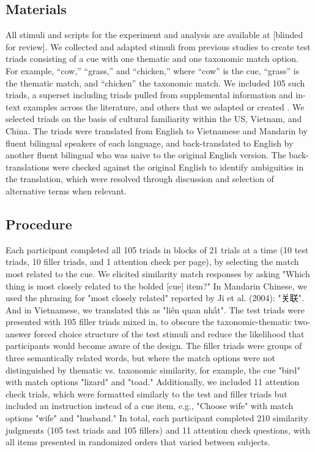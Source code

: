 \documentclass[10pt, letterpaper]{article}
\begin{document}
\hypertarget{materials}{%
\subsection{Materials}\label{materials}}

All stimuli and scripts for the experiment and analysis are available at
{[}blinded for review{]}. We collected and adapted stimuli from previous
studies to create test triads consisting of a cue with one thematic and
one taxonomic match option. For example, ``cow,'' ``grass,'' and
``chicken,'' where ``cow'' is the cue, ``grass'' is the thematic match,
and ``chicken'' the taxonomic match. We included 105 such triads, a
superset including triads pulled from supplemental information and
in-text examples across the literature, and others that we adapted or
created . We selected triads on the basis of cultural familiarity within
the US, Vietnam, and China. The triads were translated from English to
Vietnamese and Mandarin by fluent bilingual speakers of each language,
and back-translated to English by another fluent bilingual who was naive
to the original English version. The back-translations were checked
against the original English to identify ambiguities in the translation,
which were resolved through discussion and selection of alternative
terms when relevant.

\hypertarget{procedure}{%
\subsection{Procedure}\label{procedure}}

\begin{CJK*}{UTF8}{gbsn}
Each participant completed all 105 triads in blocks of 21 trials at a time (10 test triads, 10 filler triads, and 1 attention check per page), by selecting the match most related to the cue. We elicited similarity match responses by asking "Which thing is most closely related to the bolded [cue] item?" In Mandarin Chinese, we used the phrasing for "most closely related" reported by Ji et al. (2004): "关联". And in Vietnamese, we translated this as "liên quan nhất".
The test triads were presented with 105 filler triads mixed in, to obscure the taxonomic-thematic two-answer forced choice structure of the test stimuli and reduce the likelihood that participants would become aware of the design.
The filler triads were groups of three semantically related words, but where the match options were not distinguished by thematic vs. taxonomic similarity, for example, the cue "bird" with match options "lizard" and "toad." Additionally, we included 11 attention check trials, which were formatted similarly to the test and filler triads but included an instruction instead of a cue item, e.g., "Choose wife" with match options "wife" and "husband." In total, each participant completed 210 similarity judgments (105 test triads and 105 fillers) and 11 attention check questions, with all items presented in randomized orders that varied between subjects.
\end{CJK*}
\end{document}
